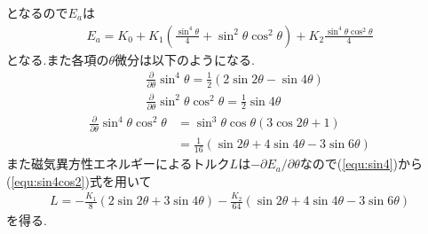 となるので$E_a$は
\begin{align}
  E_a=K_0+K_1\left(\frac{\sin^4\theta}{4}+\sin^2\theta\cos^2\theta\right)+K_2\frac{\sin^4\theta\cos^2\theta}{4}
\end{align}
となる.また各項の$\theta$微分は以下のようになる.
\begin{align}
  \label{equ:sin4}
  &\frac{\partial}{\partial\theta}\sin^4\theta=\frac{1}{2}(2\sin2\theta-\sin4\theta)\\
  \label{equ:sin2cos2}
  &\frac{\partial}{\partial\theta}\sin^2\theta\cos^2\theta=\frac{1}{2}\sin4\theta
\end{align}
\begin{align}
  \label{equ:sin4cos2}
  \frac{\partial}{\partial\theta}\sin^4\theta\cos^2\theta&=\sin^3\theta\cos\theta(3\cos2\theta+1)\nonumber\\
  &=\frac{1}{16}(\sin2\theta+4\sin4\theta-3\sin6\theta)
\end{align}
また磁気異方性エネルギーによるトルク$L$は$-\partial E_a/\partial \theta$なので(\ref{equ:sin4})から(\ref{equ:sin4cos2})式を用いて
\begin{align}
  L=-\frac{K_1}{8}(2\sin2\theta+3\sin4\theta)-\frac{K_2}{64}(\sin2\theta+4\sin4\theta-3\sin6\theta)
\end{align}
を得る.
